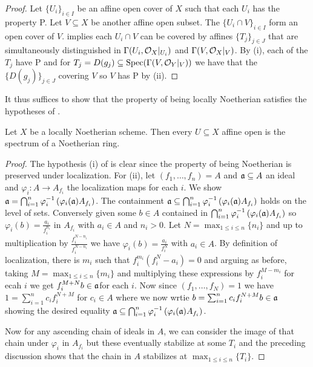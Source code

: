 \begin{proof}
    Let $\{U_{i}\}_{i\in I}$ be an affine open cover of $X$ such that each $U_{i}$ has the property P. Let $V\subseteq X$ be another affine open subset. The $\{U_{i}\cap V\}_{i\in I}$ form an open cover of $V$.  implies each $U_{i}\cap V$ can be covered by affines $\{T_{j}\}_{j\in J}$ that are simultaneously distinguished in $\Gamma(U_{i},\mathcal{O}_{X}|_{U_{i}})$ and $\Gamma(V,\mathcal{O}_{X}|_{V})$. By (i), each of the $T_{j}$ have P and for $T_{j}=D(g_{j})\subseteq\operatorname{Spec}(\Gamma(V,\mathcal{O}_{Y}|_{V}))$ we have that the $\{D(g_{j})\}_{j\in J}$ covering $V$ so $V$ has P by (ii). 
\end{proof}
It thus suffices to show that the property of being locally Noetherian satisfies the hypotheses of . 
\begin{proposition}\label{prop: all affine opens are Noetherian}
    Let $X$ be a locally Noetherian scheme. Then every $U\subseteq X$ affine open is the spectrum of a Noetherian ring. 
\end{proposition}
\begin{proof}
    The hypothesis (i) of  is clear since the property of being Noetherian is preserved under localization. For (ii), let $(f_{1},\dots,f_{n})=A$ and $\mathfrak{a}\subseteq A$ an ideal and $\varphi_{i}:A\to A_{f_{i}}$ the localization maps for each $i$. We show $\mathfrak{a}=\bigcap_{i=1}^{n}\varphi_{i}^{-1}\left(\varphi_{i}(\mathfrak{a})A_{f_{i}}\right)$. The containment $\mathfrak{a}\subseteq\bigcap_{i=1}^{n}\varphi_{i}^{-1}\left(\varphi_{i}(\mathfrak{a})A_{f_{i}}\right)$ holds on the level of sets. Conversely given some $b\in A$ contained in $\bigcap_{i=1}^{n}\varphi_{i}^{-1}\left(\varphi_{i}(\mathfrak{a})A_{f_{i}}\right)$ so $\varphi_{i}(b)=\frac{a_{i}}{f_{i}^{n_{i}}}$ in $A_{f_{i}}$ with $a_{i}\in A$ and $n_{i}>0$. Let $N=\max_{1\leq i\leq n}\{n_{i}\}$ and up to multiplication by $\frac{f_{i}^{N-n_{i}}}{f_{i}^{N-n_{i}}}$ we have $\varphi_{i}(b)=\frac{a_{i}}{f_{i}^{N}}$ with $a_{i}\in A$. By definition of localization, there is $m_{i}$ such that $f_{i}^{m_{i}}(f_{i}^{N}-a_{i})=0$ and arguing as before, taking $M=\max_{1\leq i\leq n}\{m_{i}\}$ and multiplying these expressions by $f_{i}^{M-m_{i}}$ for ecah $i$ we get $f_{i}^{M+N}b\in\mathfrak{a}$for each $i$. Now since $(f_{1},\dots,f_{N})=1$ we have $1=\sum_{i=1}^{n}c_{i}f_{i}^{N+M}$ for $c_{i}\in A$ where we now wrtie $b=\sum_{i=1}^{n}c_{i}f_{i}^{N+M}b\in\mathfrak{a}$ showing the desired equality $\mathfrak{a}\subseteq\bigcap_{i=1}^{n}\varphi_{i}^{-1}\left(\varphi_{i}(\mathfrak{a})A_{f_{i}}\right)$. 

    Now for any ascending chain of ideals in $A$, we can consider the image of that chain under $\varphi_{i}$ in $A_{f_{i}}$ but these eventually stabilize at some $T_{i}$ and the preceding discussion shows that the chain in $A$ stabilizes at $\max_{1\leq i\leq n}\{T_{i}\}$. 
\end{proof}

